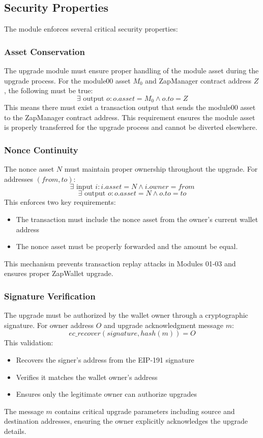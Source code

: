 \subsection{Security Properties}
The module enforces several critical security properties:




\subsubsection{Asset Conservation}
The upgrade module must ensure proper handling of the module asset during the upgrade process. For the module00
asset $M_0$ and ZapManager contract address $Z$, the following must be true:
\[ \exists \text{ output } o : o.asset = M_0 \land o.to = Z \]
This means there must exist a transaction output that sends the module00 asset to the ZapManager contract
address. This requirement ensures the module asset is properly transferred for the upgrade process and cannot be diverted elsewhere.

\subsubsection{Nonce Continuity}
The nonce asset $N$ must maintain proper ownership throughout the
upgrade. For addresses $(from, to)$:
\[ \exists \text{ input } i : i.asset = N \land i.owner = from \]
\[ \exists \text{ output } o : o.asset = N \land o.to = to \]
This enforces two key requirements:
\begin{itemize}
   \item The transaction must include the nonce asset from the owner's current wallet address
   \item The nonce asset must be properly forwarded and the amount be equal.
\end{itemize}
This mechanism prevents transaction replay attacks in Modules 01-03 and ensures proper ZapWallet upgrade.

\subsubsection{Signature Verification}
The upgrade must be authorized by the wallet owner through a cryptographic signature. For owner
address $O$ and upgrade acknowledgment message $m$:
\[ ec\_recover(signature, hash(m)) = O \]
This validation:
\begin{itemize}
   \item Recovers the signer's address from the EIP-191 signature
   \item Verifies it matches the wallet owner's address
   \item Ensures only the legitimate owner can authorize upgrades
\end{itemize}
The message $m$ contains critical upgrade parameters including source and destination addresses,
ensuring the owner explicitly acknowledges the upgrade details.




